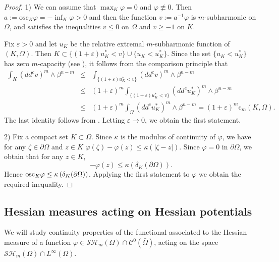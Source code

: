 \documentclass[12pt]{amsart}
\theoremstyle{definition}
\numberwithin{theorem}{section}
\numberwithin{equation}{section}
\begin{document}
\begin{proof} 
1) We can assume that $\max_K \varphi = 0$ and $\varphi \not \equiv  0$. Then $ a := \text{osc}_K  \varphi = - \inf_K \varphi > 0$ and then  the function $v := a^{-1} \varphi$ is $m$-subharmonic on $\Omega$, and satisfies the inequalities  $v \leq 0$ on $\Omega$ and $v \geq - 1$ on $K$.

 Fix $\varepsilon >0$ and let $u_K$ be the relative extremal $m$-subharmonic function of $(K,\Omega)$.  Then $ K \subset \{ (1 + \varepsilon) u_K^*  < v\} \cup \{u_K < u_K^*\}$. Since the set $\{u_K < u_K^*\}$ has zero $m$-capacity (see \cite{Lu12}), it follows from  the comparison principle that
\begin{eqnarray*}
\int_K (dd^c v)^m \wedge \beta^{n - m}  &\leq &\int_{\{ (1 + \varepsilon) u_K^*  < v\}} (dd^c v)^m \wedge \beta^{n - m} \\
&\leq & (1 + \varepsilon)^m \int_{\{(1 + \varepsilon) u_K ^* < v\}} (dd^c u_K^*)^m \wedge \beta^{n - m} \\
& \leq & (1 + \varepsilon)^m \int_\Omega  (dd^c u_K^*)^m \wedge \beta^{n - m}  =  (1 + \varepsilon)^m \text{c}_m (K,\Omega).
\end{eqnarray*}
The last identity follows from \cite{Lu12}.  Letting $\varepsilon \to 0$, we obtain the first statement. 

2) Fix a compact set $K \subset \Omega$. Since $\kappa$ is the modulus of continuity of $\varphi$, we have for any $\zeta \in \partial \Omega$ and $z \in K$
$\varphi (\zeta) - \varphi (z) \leq \kappa (\vert \zeta - z\vert)$.  Since $\varphi = 0$ in $\partial \Omega$, we obtain that for any $z \in K$,
$$
- \varphi (z) \leq \kappa \left( \delta_K (\partial \Omega)\right).
$$
Hence $\hbox{osc}_K \varphi \leq   \kappa \left( \delta_K (\partial \Omega)\right)$.  Applying the first statement to $\varphi$ we obtain the required inequality. 
\end{proof}



\subsection{ Hessian measures acting on Hessian potentials} 
We will study continuity properties of the functional associated to the Hessian measure of a function  $\varphi\in \mathcal{SH}_m(\Omega)\cap \mathcal{C}^{0} (\bar{\Omega}) $, acting on the space $\mathcal{SH}_m (\Omega) \cap L^{\infty} (\Omega)$.
\end{document}
